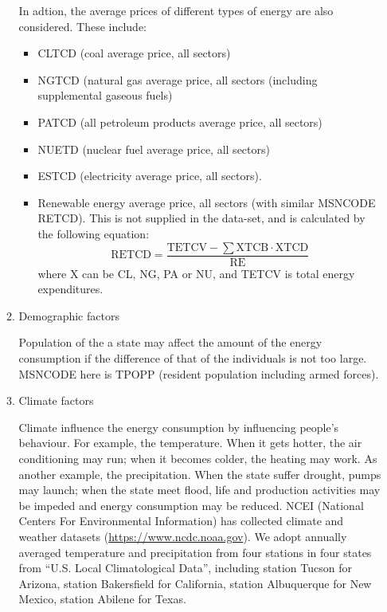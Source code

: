 \begin{enumerate}
\begin{enumerate}
    In adtion, the average prices of different types of energy are also considered. These include:
    \begin{itemize}
        \item CLTCD (coal average price, all sectors)
        \item NGTCD (natural gas average price, all sectors (including supplemental gaseous fuels)
        \item PATCD (all petroleum products average price, all sectors)
        \item NUETD (nuclear fuel average price, all sectors)
        \item ESTCD (electricity average price, all sectors). 
        \item Renewable energy average price, all sectors (with similar MSNCODE RETCD). This is not supplied in the data-set, and is calculated by the following equation:
        \begin{equation}
            \mathrm{RETCD} = \frac{\mathrm{TETCV}-\sum{\mathrm{XTCB}\cdot \mathrm{XTCD}}}
                {\mathrm{RE}}
        \end{equation}
        where $\mathrm{X}$ can be CL, NG, PA or NU, and TETCV is total energy expenditures.
        
    \end{itemize}
    \item{Demographic factors}
    \par
    Population of the a state may affect the amount of the energy consumption if the difference of that of the individuals is not too large. MSNCODE here is TPOPP (resident population including armed forces).
    \item{Climate factors}
    \par
    Climate influence the energy consumption by influencing people's behaviour. For example, the temperature. When it gets hotter, the air conditioning may run; when it becomes colder, the heating may work. As another example, the precipitation. When the state suffer drought, pumps may launch; when the state meet flood, life and production activities may be impeded and energy consumption may be reduced. NCEI (National Centers For Environmental Information) has collected climate and weather datasets (\url{https://www.ncdc.noaa.gov}). We adopt annually averaged temperature and precipitation from four stations in four states from “U.S. Local Climatological Data”, including station Tucson for Arizona, station Bakersfield for California, station Albuquerque for New Mexico, station Abilene for Texas.
\end{enumerate}


\end{enumerate}
